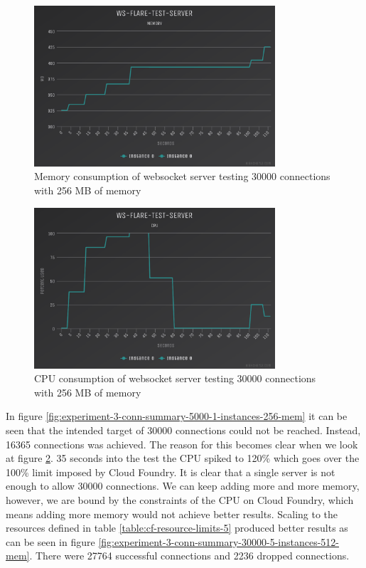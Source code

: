 \begin{figure}[H]
  \centering
    \includegraphics[width=0.8\textwidth]{figures/experiments/experiment-1/node-js/memory-30000-256-memory.png}
    \caption{Memory consumption of websocket server testing 30000 connections with 256 MB of memory}
    \label{fig:experiment-3-memory-5000-1-instances-256-mem}
\end{figure}

\begin{figure}[H]
  \centering
    \includegraphics[width=0.8\textwidth]{figures/experiments/experiment-1/node-js/cpu-30000-256-memory.png}
    \caption{CPU consumption of websocket server testing 30000 connections with 256 MB of memory}
    \label{fig:experiment-3-cpu-5000-1-instances-256-mem}
\end{figure}

In figure \ref{fig:experiment-3-conn-summary-5000-1-instances-256-mem} it can be seen that the intended target of 30000 connections could not be reached. Instead, 16365 connections was achieved. The reason for this becomes clear when we look at figure  \ref{fig:experiment-3-cpu-5000-1-instances-256-mem}. 35 seconds into the test the CPU spiked to 120\% which goes over the 100\% limit imposed by Cloud Foundry. It is clear that a single server is not enough to allow 30000 connections. We can keep adding more and more memory, however, we are bound by the constraints of the CPU on Cloud Foundry, which means adding more memory would not achieve better results. Scaling to the resources defined in table \ref{table:cf-resource-limits-5} produced better results as can be seen in figure \ref{fig:experiment-3-conn-summary-30000-5-instances-512-mem}. There were 27764 successful connections and 2236 dropped connections.

